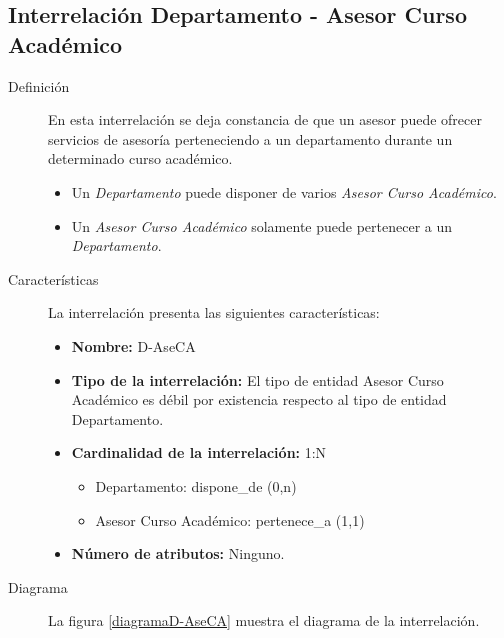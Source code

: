 \subsection{Interrelación Departamento - Asesor Curso Académico}

   \begin{description}
      \item[Definición] En esta interrelación se deja constancia de que un
      asesor puede ofrecer servicios de asesoría perteneciendo a un departamento
      durante un determinado curso académico.

      \begin{itemize}
       \item Un \textit{Departamento} puede disponer de varios \textit{Asesor
             Curso Académico}.
       \item Un \textit{Asesor Curso Académico} solamente puede pertenecer a un
             \textit{Departamento}.
      \end{itemize}

      \item[Características] La interrelación presenta las siguientes
                             características:

         \begin{itemize}
            \item \textbf{Nombre:} D-AseCA
            \item \textbf{Tipo de la interrelación:} El tipo de entidad
                  Asesor Curso Académico es débil por existencia respecto al
                  tipo de entidad Departamento.
            \item \textbf{Cardinalidad de la interrelación:} 1:N
                  \begin{itemize}
                     \item Departamento: dispone\_de (0,n)
                     \item Asesor Curso Académico: pertenece\_a (1,1)
                  \end{itemize}
            \item \textbf{Número de atributos:} Ninguno.
         \end{itemize}

      \item[Diagrama] La figura \ref{diagramaD-AseCA} muestra el diagrama de la
                      interrelación.


\end{description}
